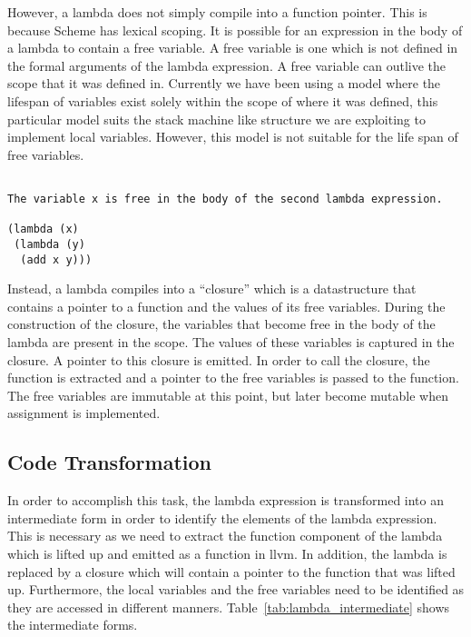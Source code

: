 \documentclass{article}
\begin{document}
However, a lambda does not simply compile into a function pointer. This is because Scheme has lexical scoping. It is possible for an expression in the body of a lambda to contain a free variable. A free variable is one which is not defined in the formal arguments of the lambda expression. A free variable can outlive the scope that it was defined in. Currently we have been using a model where the lifespan of variables exist solely within the scope of where it was defined, this particular model suits the stack machine like structure we are exploiting to implement local variables. However, this model is not suitable for the life span of free variables.

\begin{verbatim}

The variable x is free in the body of the second lambda expression. 

(lambda (x) 
 (lambda (y) 
  (add x y)))

\end{verbatim}

Instead, a lambda compiles into a ``closure'' which is a datastructure that contains a pointer to a function and the values of its free variables. During the construction of the closure, the variables that become free in the body of the lambda are present in the scope. The values of these variables is captured in the closure. A pointer to this closure is emitted. In order to call the closure, the function is extracted and a pointer to the free variables is passed to the function. The free variables are immutable at this point, but later become mutable when assignment is implemented. 
 
\subsection{Code Transformation}

In order to accomplish this task, the lambda expression is transformed into an intermediate form in order to identify the elements of the lambda expression. This is necessary as we need to extract the function component of the lambda which is lifted up and emitted as a function in llvm. In addition, the lambda is replaced by a closure which will contain a pointer to the function that was lifted up. Furthermore, the local variables and the free variables need to be identified as they are accessed in different manners.  Table~\ref{tab:lambda_intermediate} shows the intermediate forms. 
\end{document}
